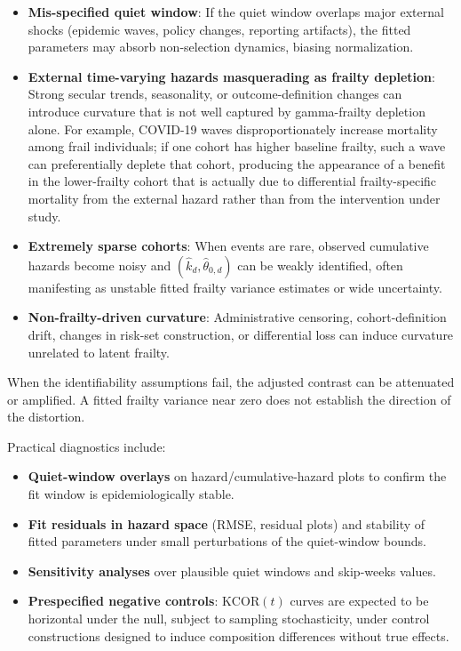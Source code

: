 \documentclass[
]{article}
\providecommand{\tightlist}{%
  \setlength{\itemsep}{0pt}\setlength{\parskip}{0pt}}
\begin{document}
\begin{itemize}
\tightlist
\item
  \textbf{Mis-specified quiet window}: If the quiet window overlaps major external shocks (epidemic waves, policy changes, reporting artifacts), the fitted parameters may absorb non-selection dynamics, biasing normalization.
\item
  \textbf{External time-varying hazards masquerading as frailty depletion}: Strong secular trends, seasonality, or outcome-definition changes can introduce curvature that is not well captured by gamma-frailty depletion alone. For example, COVID-19 waves disproportionately increase mortality among frail individuals; if one cohort has higher baseline frailty, such a wave can preferentially deplete that cohort, producing the appearance of a benefit in the lower-frailty cohort that is actually due to differential frailty-specific mortality from the external hazard rather than from the intervention under study.
\item
  \textbf{Extremely sparse cohorts}: When events are rare, observed cumulative hazards become noisy and \((\hat{k}_d,\hat{\theta}_{0,d})\) can be weakly identified, often manifesting as unstable fitted frailty variance estimates or wide uncertainty.
\item
  \textbf{Non-frailty-driven curvature}: Administrative censoring, cohort-definition drift, changes in risk-set construction, or differential loss can induce curvature unrelated to latent frailty.
\end{itemize}

When the identifiability assumptions fail, the adjusted contrast can be attenuated or amplified. A fitted frailty variance near zero does not establish the direction of the distortion.

Practical diagnostics include:

\begin{itemize}
\tightlist
\item
  \textbf{Quiet-window overlays} on hazard/cumulative-hazard plots to confirm the fit window is epidemiologically stable.
\item
  \textbf{Fit residuals in hazard space} (RMSE, residual plots) and stability of fitted parameters under small perturbations of the quiet-window bounds.
\item
  \textbf{Sensitivity analyses} over plausible quiet windows and skip-weeks values.
\item
  \textbf{Prespecified negative controls}: \(\mathrm{KCOR}(t)\) curves are expected to be horizontal under the null, subject to sampling stochasticity, under control constructions designed to induce composition differences without true effects.
\end{itemize}
\end{document}

